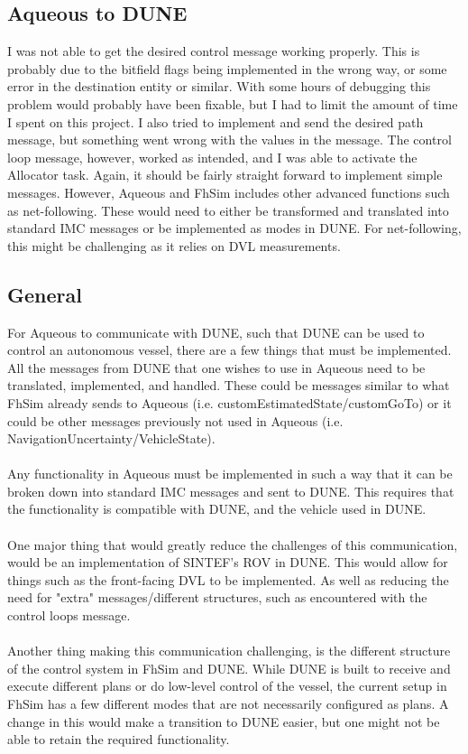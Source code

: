 \documentclass{article}
\begin{document}
\subsection{Aqueous to DUNE}
I was not able to get the desired control message working properly. 
This is probably due to the bitfield flags being implemented in the wrong way, or some error in the destination entity or similar.
With some hours of debugging this problem would probably have been fixable, but I had to limit the amount of time I spent on this project.
I also tried to implement and send the desired path message, but something went wrong with the values in the message.
The control loop message, however, worked as intended, and I was able to activate the Allocator task.
Again, it should be fairly straight forward to implement simple messages.
However, Aqueous and FhSim includes other advanced functions such as net-following.
These would need to either be transformed and translated into standard IMC messages or be implemented as modes in DUNE.
For net-following, this might be challenging as it relies on DVL measurements.

\subsection{General}
For Aqueous to communicate with DUNE, such that DUNE can be used to control an autonomous vessel, there are a few things that must be implemented.
All the messages from DUNE that one wishes to use in Aqueous need to be translated, implemented, and handled. 
These could be messages similar to what FhSim already sends to Aqueous (i.e. customEstimatedState/customGoTo) 
or it could be other messages previously not used in Aqueous (i.e. NavigationUncertainty/VehicleState).
\\~\\
Any functionality in Aqueous must be implemented in such a way that it can be broken down into standard IMC messages and sent to DUNE.
This requires that the functionality is compatible with DUNE, and the vehicle used in DUNE.
\\~\\
One major thing that would greatly reduce the challenges of this communication, would be an implementation of SINTEF's ROV in DUNE.
This would allow for things such as the front-facing DVL to be implemented.
As well as reducing the need for "extra" messages/different structures, such as encountered with the control loops message.
\\~\\
Another thing making this communication challenging, is the different structure of the control system in FhSim and DUNE. 
While DUNE is built to receive and execute different plans or do low-level control of the vessel, 
the current setup in FhSim has a few different modes that are not necessarily configured as plans.
A change in this would make a transition to DUNE easier, but one might not be able to retain the required functionality. 
\end{document}
